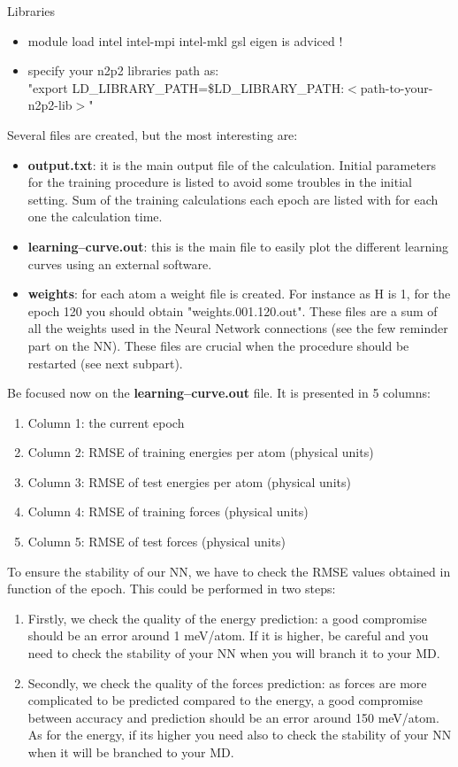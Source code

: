 \documentclass[12pt]{article}
\begin{document}
\begin{mybox4}{Libraries}
\begin{itemize}
    \item module load intel intel-mpi intel-mkl gsl eigen is adviced !
    \item specify your n2p2 libraries path as: \\ "export LD\_LIBRARY\_PATH=\$LD\_LIBRARY\_PATH:$<$path-to-your-n2p2-lib$>$"
\end{itemize}
\end{mybox4}
Several files are created, but the most interesting are:
\begin{itemize}
    \item \textbf{output.txt}: it is the main output file of the calculation. Initial parameters for the training procedure is listed to avoid some troubles in the initial setting. Sum of the training calculations each epoch are listed with for each one the calculation time. 
    \item \textbf{learning--curve.out}: this is the main file to easily plot the different learning curves using an external software.
    \item \textbf{weights}: for each atom a weight file is created. For instance as H is 1, for the epoch 120 you should obtain "weights.001.120.out". These files are a sum of all the weights used in the Neural Network connections (see the few reminder part on the NN). These files are crucial when the procedure should be restarted (see next subpart). 
\end{itemize}
Be focused now on the \textbf{learning--curve.out} file. It is presented in 5 columns:
\begin{enumerate}
    \item Column 1: the current epoch
    \item Column 2: RMSE of training energies per atom (physical units)
    \item Column 3: RMSE of test energies per atom (physical units)
    \item Column 4: RMSE of training forces (physical units)
    \item Column 5: RMSE of test forces (physical units)
\end{enumerate}
To ensure the stability of our NN, we have to check the RMSE values obtained in function of the epoch. This could be performed in two steps:
\begin{enumerate}
    \item Firstly, we check the quality of the energy prediction: a good compromise should be an error around 1 meV/atom. If it is higher, be careful and you need to check the stability of your NN when you will branch it to your MD.
    \item Secondly, we check the quality of the forces prediction: as forces are more complicated to be predicted compared to the energy, a good compromise between accuracy and prediction should be an error around 150 meV/atom. As for the energy, if its higher you need also to check the stability of your NN when it will be branched to your MD. 
\end{enumerate}
\end{document}

